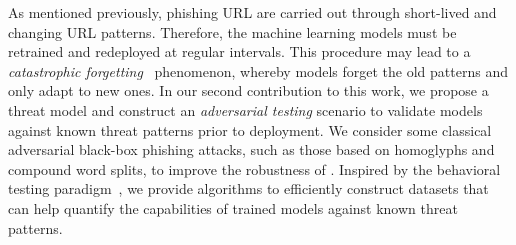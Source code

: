 As mentioned previously, phishing URL are carried out through short-lived and changing URL patterns.
Therefore, the machine learning models must be retrained and redeployed at regular intervals.
This procedure may lead to a \textit{catastrophic forgetting}~\citep{mccloskey1989catastrophic} phenomenon, whereby models forget the old patterns and only adapt to new ones.
In our second contribution to this work, we propose a threat model and construct an \textit{adversarial testing} scenario to validate models against known threat patterns prior to deployment.
We consider some classical adversarial black-box phishing attacks, such as those based on homoglyphs and compound word splits, to improve the robustness of \URLTranSys.
Inspired by the behavioral testing paradigm~\citep{ribeiro2020beyond}, we provide algorithms to efficiently construct datasets that can help quantify the capabilities of trained models against known threat patterns.








\endinput